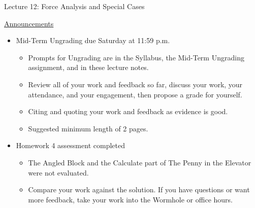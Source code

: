 \documentclass[]{article}
\newcommand{\Week}{12}
\begin{document}
\begin{PresentSpace}
\begin{center}
	\huge Lecture \Week: Force Analysis and Special Cases
\end{center}
\vspace{0.5cm}
\underline{Announcements}
\begin{itemize}
	\item Mid-Term Ungrading due Saturday at 11:59 p.m.
	\begin{itemize}
		\item Prompts for Ungrading are in the Syllabus, the Mid-Term Ungrading assignment, and in these lecture notes.
		\item Review all of your work and feedback so far, discuss your work, your attendance, and your engagement, then propose a grade for yourself.
		\item Citing and quoting your work and feedback as evidence is good.
		\item Suggested minimum length of 2 pages.
	\end{itemize}
	\item Homework 4 assessment completed
	\begin{itemize}
		\item The Angled Block and the Calculate part of The Penny in the Elevator were not evaluated.
		\item Compare your work against the solution. If you have questions or want more feedback, take your work into the Wormhole or office hours.
	\end{itemize}
\end{itemize}
\end{PresentSpace}
\newpage
\begin{TeacherMargin}

\end{TeacherMargin}
\end{document}

